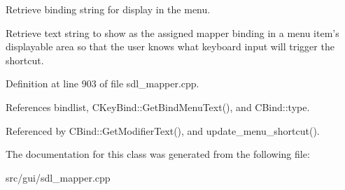 Retrieve binding string for display in the menu. 

Retrieve text string to show as the assigned mapper binding in a menu item's displayable area so that the user knows what keyboard input will trigger the shortcut. 

Definition at line 903 of file sdl\-\_\-mapper.\-cpp.



References bindlist, C\-Key\-Bind\-::\-Get\-Bind\-Menu\-Text(), and C\-Bind\-::type.



Referenced by C\-Bind\-::\-Get\-Modifier\-Text(), and update\-\_\-menu\-\_\-shortcut().



The documentation for this class was generated from the following file\-:\begin{DoxyCompactItemize}
\item 
src/gui/sdl\-\_\-mapper.\-cpp\end{DoxyCompactItemize}
